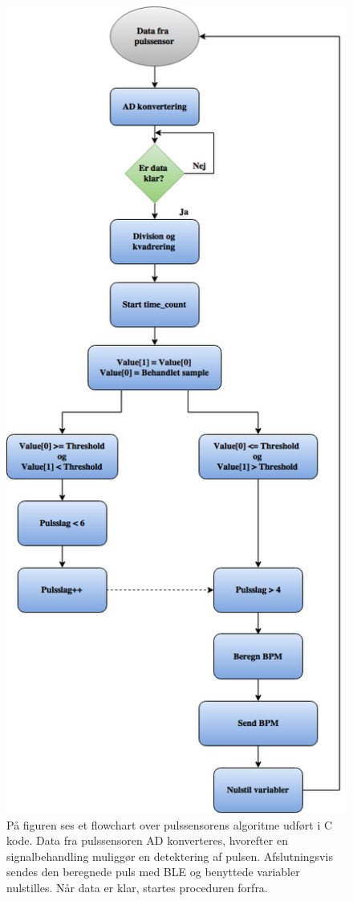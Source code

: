 \begin{figure}[H]
	\centering
	\includegraphics[scale=0.4]{figures/cDesign/Puls_ckode.png}
	\caption{På figuren ses et flowchart over pulssensorens algoritme udført i C kode. Data fra pulssensoren AD konverteres, hvorefter en signalbehandling muliggør en detektering af pulsen. Afslutningsvis sendes den beregnede puls med BLE og benyttede variabler nulstilles. Når data er klar, startes proceduren forfra.}
	\label{fig:puls_pseudo_c}
\end{figure} \vspace{-.25cm}
